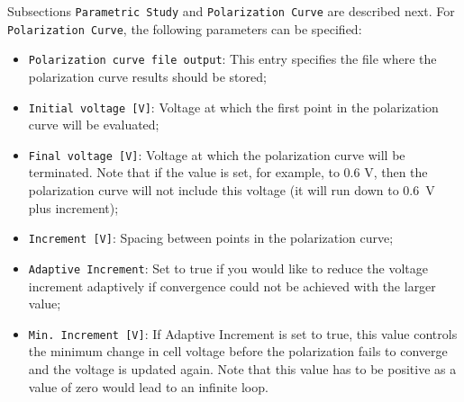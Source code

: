 Subsections \texttt{Parametric Study} and \texttt{Polarization Curve} are described next. For \texttt{Polarization Curve}, the following parameters can be specified:
\begin{itemize}
  \item \texttt{Polarization curve file output}: This entry specifies the file where the polarization curve results should be stored;
  \item \texttt{Initial voltage [V]}: Voltage at which the first point in the polarization curve will be evaluated;
  \item \texttt{Final voltage [V]}: Voltage at which the polarization curve will be terminated. Note that if the value is set, for example, to 0.6 V, then the polarization curve will not include this voltage (it will run down to 0.6~V plus increment);
  \item \texttt{Increment [V]}: Spacing between points in the polarization curve;
  \item \texttt{Adaptive Increment}: Set to true if you would like to reduce the voltage increment adaptively if convergence could not be achieved with the larger value;
  \item \texttt{Min.~Increment [V]}: If Adaptive Increment is set to true, this value controls the minimum change in cell voltage before the polarization fails to converge and the voltage is updated again. Note that this value has to be positive as a value of zero would lead to an infinite loop.
\end{itemize}

